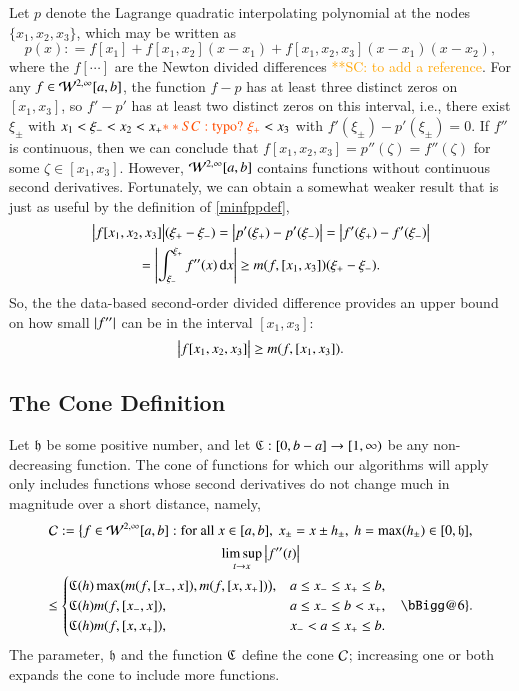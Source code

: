 \documentclass[review]{elsarticle}
\makeatletter
\newcommand{\Vast}{\bBigg@{6}}
\newcommand{\Vastr}{\mathclose\Vast}
\newcommand{\scnote}[1]{ {\textcolor{orange}  {**SC: #1}}}
\makeatother
\begin{document}
Let $p$ denote the Lagrange quadratic interpolating polynomial at the nodes
$\{x_1, x_2, x_3\}$, which may be written as
\begin{equation*}
p(x) : = f[x_1] + f[x_1, x_2](x-x_1) + f[x_1, x_2, x_3](x-x_1)(x-x_2), 
\end{equation*}
where the $f[\cdots]$ are the Newton divided differences \cite{}\scnote{to add a reference}. For any $f \in
\mathcal{W}^{2,\infty}[a,b]$, the function $f - p$ has at least three distinct zeros on
$[x_1, x_3]$, so $f' - p'$ has at least two distinct zeros on this interval,
i.e., there exist $\xi_\pm$ with $x_1 < \xi_- < x_2 < x_+ \scnote{\mbox{typo?  }  \xi_+} < x_3$ with
$f'(\xi_\pm) - p'(\xi_{\pm}) = 0$. If $f''$ is continuous, then we can conclude
that $ f[x_1, x_2, x_3]= p''(\zeta) =f''(\zeta) $ for some $\zeta \in [x_1,
x_3]$. However, $\mathcal{W}^{2,\infty}[a,b]$ contains functions without continuous
second derivatives. Fortunately, we can obtain a somewhat weaker result that is
just as useful by the definition of \eqref{minfppdef},
\begin{multline*}
\bigl \lvert f[x_1, x_2, x_3] \bigr \rvert(\xi_+  - \xi_-) = \left \lvert p'(\xi_+) - p'(\xi_-) \right \rvert =  \left \lvert f'(\xi_+) - f'(\xi_-) \right \rvert \\
= \left \lvert \int_{\xi_-}^{\xi_+} f''(x) \, {\rm d} x \right \rvert \ge m(f,[x_1, x_3]) (\xi_+  - \xi_-).
\end{multline*}
So, the the data-based second-order divided difference provides an upper
bound on how small $\left \lvert f'' \right \rvert$ can be in the interval $[x_1, x_3]$:
\begin{equation}
\bigl \lvert f[x_1, x_2, x_3] \bigr \rvert \ge m(f,[x_1, x_3]).
\end{equation}

\subsection{The Cone Definition}  \label{sec:conedef}

Let $\mathfrak{h}$ be some positive number, and let $\mathfrak{C} : [0,b-a] \to [1,\infty)$ be any
non-decreasing function. The cone of functions for which our algorithms will
apply only includes functions whose second derivatives do not change much in
magnitude over a short distance, namely,
\begin{multline} \label{conedef}
\cc : = \bigl \{ f \in \cw^{2,\infty}[a,b] : \text{for all }x \in [a,b], \ x_\pm = x \pm h_\pm, \ h = \max(h_{\pm}) \in [0, \fh], \\  \limsup_{t \to x}\abs{f''(t)} \\
\le \begin{cases} \fC(h) \max\bigl(m(f,[x_-,x]),m(f,[x,x_+])\bigr), & a \le x_- \le x_+ \le b,\\
\fC(h) m(f,[x_-,x]), & a \le x_- \le b <  x_+, \\
\fC(h) m(f,[x,x_+]), & x_- < a \le x_+ \le b.
\end{cases} \quad
 \Vastr \}.
\end{multline}
The parameter, $\mathfrak{h}$ and the function $\mathfrak{C}$ define the cone $\mathcal{C}$; increasing
one or both expands the cone to include more functions.
\end{document}
